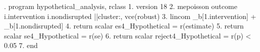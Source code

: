 . program hypothetical_analysis, rclass
  1.   version 18
  2.   mepoisson outcome i.intervention i.nondisrupted ||cluster:, vce(robust)
  3.   lincom _b[1.intervention] + _b[1.nondisrupted]
  4.   return scalar es4_Hypothetical      = r(estimate)
  5.   return scalar se4_Hypothetical      = r(se)
  6.   return scalar reject4_Hypothetical  = r(p) < 0.05
  7. end
{\smallskip}

